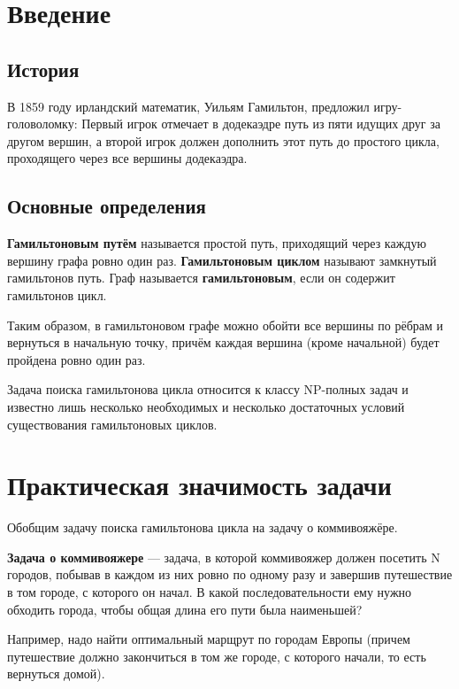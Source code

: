 





\tableofcontents
\newpage

\section{Введение}

\subsection{История}
В 1859 году ирландский математик, Уильям Гамильтон, предложил игру-головоломку:
Первый игрок отмечает в додекаэдре путь из пяти идущих друг за другом вершин, а второй игрок должен дополнить этот путь до простого цикла, проходящего
через все вершины додекаэдра.

\subsection{Основные определения}
{\bf Гамильтоновым путём} называется простой путь, приходящий через каждую вершину графа ровно один раз.
{\bf Гамильтоновым циклом} называют замкнутый гамильтонов путь.
Граф называется {\bf гамильтоновым}, если он содержит гамильтонов цикл.

Таким образом, в гамильтоновом графе можно обойти все вершины по рёбрам и вернуться в начальную точку, причём каждая вершина (кроме начальной) будет пройдена ровно один раз.

Задача поиска гамильтонова цикла относится к классу NP-полных задач и известно лишь несколько необходимых и несколько достаточных условий существования гамильтоновых циклов.

\section{Практическая значимость задачи}
Обобщим задачу поиска гамильтонова цикла на задачу о коммивояжёре.

{\bf Задача о коммивояжере} — задача, в которой коммивояжер должен посетить N городов, побывав в каждом из них ровно по одному разу и завершив путешествие в том городе, с которого он начал.
В какой последовательности ему нужно обходить города, чтобы общая длина его пути была наименьшей?

Например, надо найти оптимальный марщрут по городам Европы (причем путешествие должно закончиться в том же городе, с которого начали, то есть вернуться домой).

